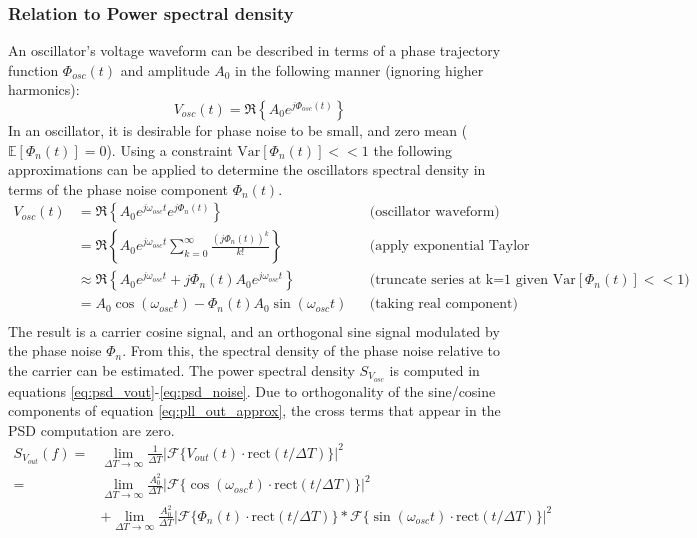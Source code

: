 		\subsubsection{Relation to Power spectral density}\label{sec:pn_to_psd}
		An oscillator's voltage waveform can be described in terms of a phase trajectory function $\Phi_{osc}(t)$ and amplitude $A_0$ in the following manner (ignoring higher harmonics):
		\begin{equation}\label{eq:osc_wfm}
			V_{osc}(t) = \Re\left\{A_0e^{j\Phi_{osc}(t)}\right\}
		\end{equation}
		 In an oscillator, it is desirable for phase noise to be small, and zero mean ($\mathbb{E}[\Phi_{n}(t)]=0$). Using a constraint $\mathrm{Var}[\Phi_{n}(t)] << 1$ the following approximations can be applied to determine the oscillators spectral density in terms of the phase noise component $\Phi_n(t)$.
		\begin{align}
			V_{osc}(t) &= \Re\left\{A_0e^{j\omega_{osc}t}e^{j\Phi_{n}(t)}\right\} && \text{(oscillator waveform)} \\
			&= \Re\left\{A_0e^{j\omega_{osc}t}\sum_{k=0}^\infty\frac{(j\Phi_{n}(t))^k}{k!}\right\} && \text{(apply exponential Taylor series)} \\
			&\approx  \Re\left\{A_0e^{j\omega_{osc}t} +j\Phi_{n}(t)A_0e^{j\omega_{osc}t}\right\} && \text{(truncate series at k=1 given $\mathrm{Var}[\Phi_{n}(t)] << 1$)} \\
			&= A_0\cos(\omega_{osc}t) - \Phi_{n}(t)A_0\sin(\omega_{osc}t) &&\text{(taking real component)}\label{eq:pll_out_approx}\\
		\end{align}
		The result is a carrier cosine signal, and an orthogonal sine signal modulated by the phase noise $\Phi_{n}$. From this, the spectral density of the phase noise relative to the carrier can be estimated. The power spectral density $S_{V_{osc}}$ is computed in equations \ref{eq:psd_vout}-\ref{eq:psd_noise}. Due to orthogonality of the sine/cosine components of equation \ref{eq:pll_out_approx}, the cross terms that appear in the PSD computation are zero. 
		\begin{align}
			S_{V_{out}}(f) =& \lim_{\Delta T\rightarrow\infty}\frac{1}{\Delta T}|\mathcal{F}\{V_{out}(t)\cdot\mathrm{rect}(t/\Delta T)\}|^2 \label{eq:psd_vout}\\
			=&\lim_{\Delta T\rightarrow\infty}\frac{A_0^2}{\Delta T}|\mathcal{F}\{\cos(\omega_{osc}t)\cdot\mathrm{rect}(t/\Delta T)\}|^2 \label{eq:psd_carrier}\\ 
			&+ \lim_{\Delta T\rightarrow\infty}\frac{A_0^2}{\Delta T}|\mathcal{F}\{\Phi_{n}(t)\cdot\mathrm{rect}(t/\Delta T)\}*\mathcal{F}\{\sin(\omega_{osc}t)\cdot\mathrm{rect}(t/\Delta T)\}|^2 \label{eq:psd_noise}\\
		\end{align}

